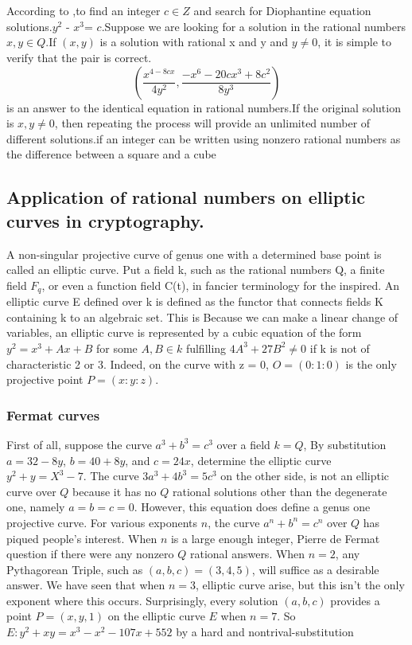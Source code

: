 \chapter{}
According to \cite{Silverman2015},to find an integer $c \in Z$ and search for Diophantine equation solutions.$y^{2}$ - $x^{3}$= $c$.Suppose we are looking for a solution in the rational numbers $x,y \in Q$.If $(x, y)$ is a solution with rational x and y and $y \neq 0$, it is simple to verify that the pair is correct.\\

$$(\frac{x^{4-8cx}}{4y^{2}},\frac{-x^{6}-20cx^{3}+8c^{2}}{8y^{3}})$$
is an answer to the identical equation in rational numbers.If the original solution is $x,y \neq 0$, then repeating the process will provide an unlimited number of different solutions.if an integer can be written using nonzero rational numbers as the difference between a square and a cube
\section{ Application of rational numbers on elliptic curves in cryptography.}
A non-singular projective curve of genus one with a determined base point is called an elliptic curve. Put a field k, such as the rational numbers Q, a finite field $F_{q}$, or even a function field C(t), in fancier terminology for the inspired. An elliptic curve E defined over k is defined as the functor that connects fields K containing k to an algebraic set.
This is Because we can make a linear change of variables, an elliptic curve is represented by a cubic equation of the form $y^{2} = x^{3} + Ax + B$ for some $A, B \in k$ fulfilling $4A^{3} + 27B^{2} \neq0$ if k is not of characteristic 2 or 3. Indeed, on the curve with z = 0, $O = (0 :1: 0)$ is the only projective point $P = (x:y:z)$.

\subsection{Fermat curves}
First of all, suppose the curve $a^{3}+b^{3}=c^{3}$ over a field $k=Q$, By substitution $a=32-8y$, $b=40+8y$, and $c=24x$, determine the elliptic curve $y^{2}+y=X^{3}-7$. The curve  $3a^{3}+4b^{3}=5c^{3}$ on the other side, is not an elliptic curve over $Q$ because it has no $Q$ rational solutions other than the degenerate one, namely $a=b=c=0$. However, this equation does define a genus one projective curve. For various exponents $n$, the curve $a^{n}+b^{n}=c^{n}$ over $Q$ has piqued people's interest. When $n$ is a large enough integer, Pierre de Fermat question if there were any nonzero $Q$ rational answers. When $n=2$, any Pythagorean Triple, such as $(a, b, c)=(3, 4, 5)$, will suffice as a desirable answer. We have seen that when $n=3$, elliptic curve arise, but this isn't the only exponent where this occurs. Surprisingly, every solution $(a,b,c)$ provides a point $P=(x, y, 1)$ on the elliptic curve $E$ when $n=7$. So $E:y^{2}+xy=x^{3}-x^{2}-107x+552$ by a hard and nontrival-substitution


